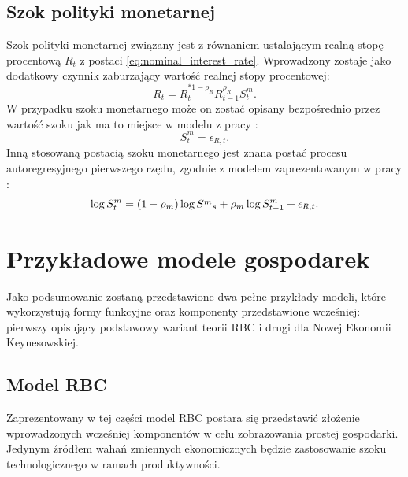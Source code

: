 \subsection{Szok polityki monetarnej}

Szok polityki monetarnej związany jest z równaniem ustalającym realną stopę procentową $R_t$ z postaci \eqref{eq:nominal_interest_rate}. Wprowadzony zostaje jako dodatkowy czynnik zaburzający wartość realnej stopy procentowej:
\begin{equation}
    R_t = R_t^{*1-\rho_R}R_{t-1}^{\rho_R} S^m_{t}.
\end{equation}
W przypadku szoku monetarnego może on zostać opisany bezpośrednio przez wartość szoku jak ma to miejsce w modelu z pracy \cite{herbst}:
\begin{equation}
    S^m_{t} = \epsilon_{R,t}.
\end{equation}
Inną stosowaną postacią szoku monetarnego jest znana postać procesu autoregresyjnego pierwszego rzędu, zgodnie z modelem zaprezentowanym w pracy \cite{costaBook}:
\begin{equation}
    \log{S^m_t} = (1-\rho_m)\log {\bar{S^m}_s} + \rho_m \log {S^m_{t-1}} + \epsilon_{R,t}.
\end{equation}

\section{Przykładowe modele gospodarek}
\label{sec:sample_models}

Jako podsumowanie zostaną przedstawione dwa pełne przykłady modeli, które wykorzystują formy funkcyjne oraz komponenty przedstawione wcześniej: pierwszy opisujący podstawowy wariant teorii RBC i drugi dla Nowej Ekonomii Keynesowskiej.

\subsection{Model RBC}
\label{sec:rbc_model_sample}

Zaprezentowany w tej części model RBC postara się przedstawić złożenie wprowadzonych wcześniej komponentów w celu zobrazowania prostej gospodarki. Jedynym źródłem wahań zmiennych ekonomicznych będzie zastosowanie szoku technologicznego w ramach produktywności.

